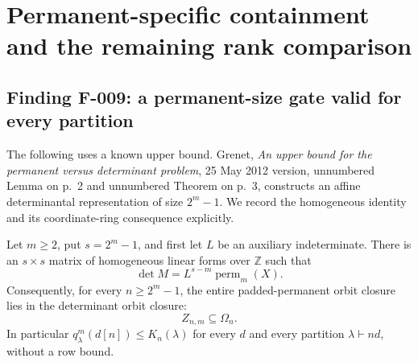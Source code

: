\section{Permanent-specific containment and the remaining rank comparison}

\subsection*{Finding F-009: a permanent-size gate valid for every partition}
The following uses a known upper bound.  Grenet,
\emph{An upper bound for the permanent versus determinant problem},
25 May 2012 version, unnumbered Lemma on p.~2 and unnumbered
Theorem on p.~3, constructs an affine determinantal representation
of size \(2^m-1\).  We record the homogeneous identity and its
coordinate-ring consequence explicitly.

Let \(m\geq2\), put \(s=2^m-1\), and first let \(L\) be an
auxiliary indeterminate.  There is an \(s\times s\) matrix of homogeneous
linear forms over \(\mathbb Z\) such that
\begin{equation}\label{eq:F009}
                    \det M=L^{s-m}\operatorname{perm}_m(X).
\end{equation}
Consequently, for every \(n\geq2^m-1\), the entire padded-permanent
orbit closure lies in the determinant orbit closure:
\[
                         Z_{n,m}\subseteq\Omega_n.
\]
In particular \(q^m_\lambda(d[n])\leq K_n(\lambda)\) for every
\(d\) and every partition \(\lambda\vdash nd\), without a row bound.


